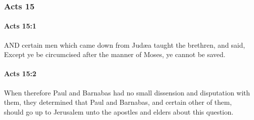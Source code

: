 	\subsubsection{Acts 15} %
		\label{ACTS-15}
		
		\paragraph{Acts 15:1} %
			\label{ACTS-15-1}

			AND certain men which came down from Judæa taught the brethren, and said, Except ye be circumcised after the manner of Moses, ye cannot be saved.

			\begin{framed}
			\scriptsize
				\begin{compactdesc}
					\item[SBLG] 
				\end{compactdesc}
			\end{framed}

		\paragraph{Acts 15:2} %
			\label{ACTS-15-2}

			When therefore Paul and Barnabas had no small dissension and disputation with them, they determined that Paul and Barnabas, and certain other of them, should go up to Jerusalem unto the apostles and elders about this question.

